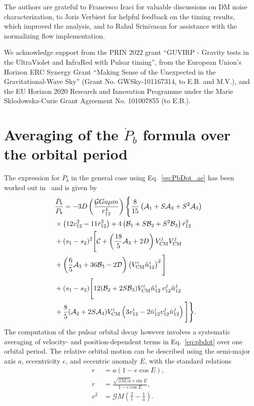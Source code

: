 \documentclass[
    floats,
    floatfix,
    amssymb,
    prd,
    twocolumn,
    superscriptaddress,
    nofootinbib,
    unicode,
    colorlinks=true,
    linktocpage=true
]{revtex4-2}
\begin{document}
\begin{acknowledgments}
The authors are grateful to Francesco Iraci for valuable discussions on DM noise characterization, to Joris Verbiest for helpful feedback on the timing results, which improved the analysis, and to Rahul Srinivasan for assistance with the normalizing flow implementation.

We acknowledge support from the PRIN 2022 grant ``GUVIRP - Gravity tests in the UltraViolet and InfraRed with Pulsar timing'', from the European Union’s Horizon ERC Synergy Grant ``Making Sense of the Unexpected in the Gravitational-Wave Sky'' (Grant No. GWSky-101167314, to E.B. and M.V.), and the EU Horizon 2020 Research and Innovation Programme under the Marie Sklodowska-Curie Grant Agreement No. 101007855 (to E.B.).
\end{acknowledgments}

\appendix

\section{Averaging of the $\dot{P}_b$ formula over the orbital period}
\label{app:average}

The expression for $\dot{P}_b$ in the general case using Eq.~\eqref{eq:PbDot_ae} has been worked out in~\cite{Yagi_2014} and is given by
\begin{equation}
\begin{split}
&\frac{\dot P_b}{P_b} =
-3 D \left(\frac{\mathcal{G} G a \mu m}{r_{12}^{4}}\right)
\Bigg\{
\frac{8}{15}
\left(\mathcal{A}_1 + S \mathcal{A}_2 + S^2 \mathcal{A}_3\right) 
\\
&\times
\left(12 v_{12}^2 - 11 \dot r_{12}^2\right) + 4 \left(\mathcal{B}_1 + S \mathcal{B}_2 + S^2 \mathcal{B}_3\right)\dot r_{12}^2
\\
&+ (s_1 - s_2)^2
\Bigg[
\mathcal{C}
+ \left(\frac{18}{5} \mathcal{A}_3 + 2D\right) V_{\rm CM}^j V_{\rm CM}^j
\\
&+ \left(\frac{6}{5} \mathcal{A}_3 + 36 \mathcal{B}_3 - 2\mathcal{D}\right)
\left(V_{\rm CM}^i \hat n_{12}^i\right)^2
\Bigg]
\\
&+ (s_1 - s_2)
\Bigg[
12(\mathcal{B}_2 + 2 S \mathcal{B}_3)
V_{\rm CM}^i \hat n_{12}^i
\, v_{12}^j \hat n_{12}^j
\\
&+ \frac{8}{5}(\mathcal{A}_2 + 2 S \mathcal{A}_3)
V_{\rm CM}^i
\left(3 v_{12}^i
- 2 \hat n_{12}^i v_{12}^j \hat n_{12}^j\right)
\Bigg]
\Bigg\}.
\label{eq:pbdot}
\end{split}
\end{equation}
The computation of the pulsar orbital decay however involves a systematic averaging of velocity- and
position-dependent terms in Eq.~\eqref{eq:pbdot} over one orbital period. The relative orbital
motion can be described using the semi-major axis $a$, eccentricity $e$,
and eccentric anomaly $E$, with the standard relations
%
\begin{align}
r &= a (1 - e \cos E), \\
\dot r &=
\frac{\sqrt{\mathcal{G} M / a}\; e \sin E}{1 - e \cos E}, \\
v^2 &= \mathcal{G} M
\left(\frac{2}{r} - \frac{1}{a}\right).
\end{align}
\end{document}
